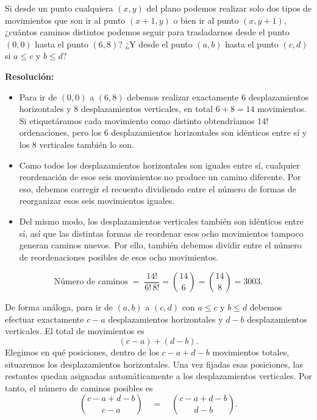\documentclass[a4paper,12pt]{article}
\begin{document}
\begin{ejercicio}[title=Ejercicio 45]
Si desde un punto cualquiera \((x,y)\) del plano podemos realizar solo dos tipos de movimientos que son ir al punto \((x+1,y)\) o bien ir al punto \((x,y+1)\), ¿cuántos caminos distintos podemos seguir para trasladarnos desde el punto \((0,0)\) hasta el punto \((6,8)\)? ¿Y desde el punto \((a,b)\) hasta el punto \((c,d)\) si \(a\le c\) y \(b\le d\)?
 
\tcblower
\textbf{Resolución:}

\begin{itemize}

\item Para ir de \((0,0)\) a \((6,8)\) debemos realizar exactamente 6 desplazamientos horizontales y 8 desplazamientos verticales, en total \(6+8=14\) movimientos. Si etiquetáramos cada movimiento como distinto obtendríamos \(14!\) ordenaciones, pero los 6 desplazamientos horizontales son idénticos entre sí y los 8 verticales también lo son.

\item Como todos los desplazamientos horizontales son iguales entre sí, cualquier reordenación de esos seis movimientos no produce un camino diferente. Por eso, debemos corregir el recuento dividiendo entre el número de formas de reorganizar esos seis movimientos iguales.

\item Del mismo modo, los desplazamientos verticales también son idénticos entre sí, así que las distintas formas de reordenar esos ocho movimientos tampoco generan caminos nuevos. Por ello, también debemos dividir entre el número de reordenaciones posibles de esos ocho movimientos.
\end{itemize}

\[
\text{Número de caminos} \;=\; \frac{14!}{6!\,8!}
= \binom{14}{6}=\binom{14}{8} = \boxed{3003}.
\]

\bigskip

\noindent De forma análoga, para ir de \((a,b)\) a \((c,d)\) con \(a\le c\) y \(b\le d\) debemos efectuar exactamente \(c-a\) desplazamientos horizontales y \(d-b\) desplazamientos verticales. El total de movimientos es
\[
(c-a)+(d-b).
\]
Elegimos en qué posiciones, dentro de los \(c-a+d-b\) movimientos totales, situaremos los desplazamientos horizontales. Una vez fijadas esas posiciones, las restantes quedan asignadas automáticamente a los desplazamientos verticales. Por tanto, el número de caminos posibles es
\[
\boxed{\binom{c-a+d-b}{\,c-a\,}
\quad=\quad
\binom{c-a+d-b}{\,d-b\,}}.
\]

\end{ejercicio}
\end{document}
